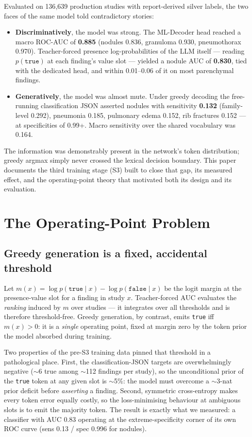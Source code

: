 \documentclass[10pt,a4paper]{article}
\begin{document}
Evaluated on 136{,}639 production studies with report-derived silver labels, the two
faces of the same model told contradictory stories:

\begin{itemize}[leftmargin=1.4em,itemsep=1pt]
\item \textbf{Discriminatively}, the model was strong. The ML-Decoder head reached a
macro ROC-AUC of \textbf{0.885} (nodules 0.836, granuloma 0.930, pneumothorax 0.970).
Teacher-forced presence log-probabilities of the LLM itself --- reading
$p(\texttt{true})$ at each finding's value slot --- yielded a nodule AUC of
\textbf{0.830}, tied with the dedicated head, and within 0.01--0.06 of it on most
parenchymal findings.
\item \textbf{Generatively}, the model was almost mute. Under greedy decoding the
free-running classification JSON asserted nodules with sensitivity \textbf{0.132}
(family-level 0.292), pneumonia 0.185, pulmonary edema 0.152, rib fractures 0.152 ---
at specificities of 0.99+. Macro sensitivity over the shared vocabulary was 0.164.
\end{itemize}

The information was demonstrably present in the network's token distribution; greedy
argmax simply never crossed the lexical decision boundary. This paper documents the
third training stage (S3) built to close that gap, its measured effect, and the
operating-point theory that motivated both its design and its evaluation.

\section{The Operating-Point Problem}

\subsection{Greedy generation is a fixed, accidental threshold}

Let $m(x) = \log p(\texttt{true}\mid x) - \log p(\texttt{false}\mid x)$ be the logit
margin at the presence-value slot for a finding in study $x$. Teacher-forced AUC
evaluates the \emph{ranking} induced by $m$ over studies --- it integrates over all
thresholds and is therefore threshold-free. Greedy generation, by contrast, emits
\texttt{true} iff $m(x) > 0$: it is a \emph{single} operating point, fixed at margin
zero by the token prior the model absorbed during training.

Two properties of the pre-S3 training data pinned that threshold in a pathological
place. First, the classification-JSON targets are overwhelmingly negative ($\sim$6 true
among $\sim$112 findings per study), so the unconditional prior of the \texttt{true}
token at any given slot is $\sim$5\%: the model must overcome a $\sim$3-nat prior
deficit before \emph{asserting} a finding. Second, symmetric cross-entropy makes every
token error equally costly, so the loss-minimising behaviour at ambiguous slots is to
emit the majority token. The result is exactly what we measured: a classifier with AUC
0.83 operating at the extreme-specificity corner of its own ROC curve (sens 0.13 /
spec 0.996 for nodules).
\end{document}
